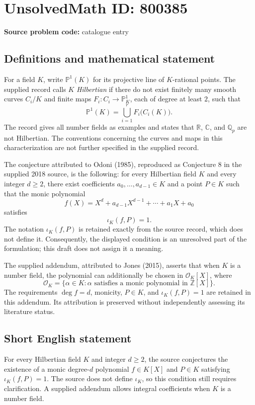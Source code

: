 \documentclass[11pt]{article}
\newcommand{\Z}{\mathbb{Z}}
\newcommand{\Q}{\mathbb{Q}}
\newcommand{\R}{\mathbb{R}}
\newcommand{\C}{\mathbb{C}}
\newcommand{\PP}{\mathbb{P}}
\begin{document}
\section*{UnsolvedMath ID: 800385}
\textbf{Source problem code:} catalogue entry
\subsection{Definitions and mathematical statement}
For a field \(K\), write \(\PP^1(K)\) for its projective line of \(K\)-rational points. The supplied record calls \(K\) \emph{Hilbertian} if there do not exist finitely many smooth curves \(C_i/K\) and finite maps \(F_i:C_i\to\PP^1_K\), each of degree at least \(2\), such that
\[
\PP^1(K)=\bigcup_{i=1}^{r}F_i\bigl(C_i(K)\bigr).
\]
The record gives all number fields as examples and states that \(\R\), \(\C\), and \(\Q_p\) are not Hilbertian. The conventions concerning the curves and maps in this characterization are not further specified in the supplied record.

The conjecture attributed to Odoni (1985), reproduced as Conjecture 8 in the supplied 2018 source, is the following: for every Hilbertian field \(K\) and every integer \(d\geq2\), there exist coefficients \(a_0,\ldots,a_{d-1}\in K\) and a point \(P\in K\) such that the monic polynomial
\[
f(X)=X^d+a_{d-1}X^{d-1}+\cdots+a_1X+a_0
\]
satisfies
\[
\iota_K(f,P)=1.
\]
The notation \(\iota_K(f,P)\) is retained exactly from the source record, which does not define it. Consequently, the displayed condition is an unresolved part of the formulation; this draft does not assign it a meaning.

The supplied addendum, attributed to Jones (2015), asserts that when \(K\) is a number field, the polynomial can additionally be chosen in \(\mathcal O_K[X]\), where
\[
\mathcal O_K=\{\alpha\in K:\alpha\text{ satisfies a monic polynomial in }\Z[X]\}.
\]
The requirements \(\deg f=d\), monicity, \(P\in K\), and \(\iota_K(f,P)=1\) are retained in this addendum. Its attribution is preserved without independently assessing its literature status.
\subsection{Short English statement}
For every Hilbertian field \(K\) and integer \(d\geq2\), the source conjectures the existence of a monic degree-\(d\) polynomial \(f\in K[X]\) and \(P\in K\) satisfying \(\iota_K(f,P)=1\). The source does not define \(\iota_K\), so this condition still requires clarification. A supplied addendum allows integral coefficients when \(K\) is a number field.
\end{document}
